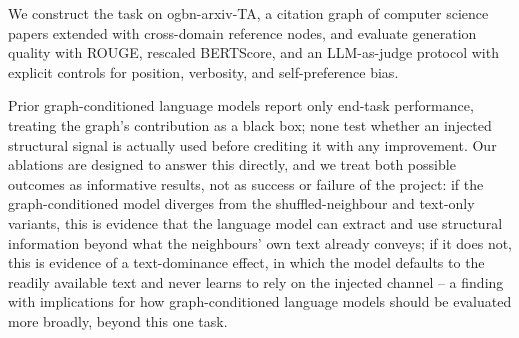\documentclass[12pt]{article}
\begin{document}
We construct the task on ogbn-arxiv-TA, a citation graph of computer
science papers extended with cross-domain reference nodes, and
evaluate generation quality with ROUGE, rescaled BERTScore, and an
LLM-as-judge protocol with explicit controls for position, verbosity,
and self-preference bias.

Prior graph-conditioned language models report only end-task
performance, treating the graph's contribution as a black box; none
test whether an injected structural signal is actually used before
crediting it with any improvement. Our ablations are designed to
answer this directly, and we treat both possible outcomes as
informative results, not as success or failure of the project: if the
graph-conditioned model diverges from the shuffled-neighbour and
text-only variants, this is evidence that the language model can
extract and use structural information beyond what the neighbours'
own text already conveys; if it does not, this is evidence of a
text-dominance effect, in which the model defaults to the readily
available text and never learns to rely on the injected channel -- a
finding with implications for how graph-conditioned language models
should be evaluated more broadly, beyond this one task.
\end{document}
